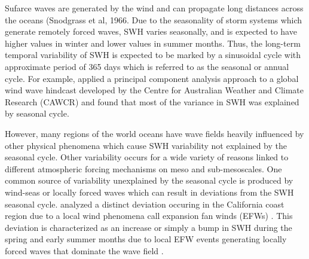 \documentclass[draft,linenumbers]{agujournal2018}
\begin{document}
Sufarce waves are generated by the wind and can propagate long distances across the oceans (Snodgrass et al, 1966. Due to the seasonality of storm systems which generate remotely forced waves, SWH varies seasonally, and is expected to have higher values in winter and lower values in summer months. Thus, the long-term temporal variability of SWH is expected to be marked by a sinusoidal cycle with approximate period of 365 days which is referred to as the seasonal or annual cycle. For example, \citet{echevarria2019seasonal} applied a principal component analysis approach to a global wind wave hindcast developed by the Centre for Australian Weather and Climate Research (CAWCR) and found that most of the variance in SWH was explained by seasonal cycle. 


However, many regions of the world oceans have wave fields heavily influenced by other physical phenomena which cause SWH variability not explained by the seasonal cycle. Other variability occurs for a wide variety of reasons linked to different atmospheric forcing mechanisms on meso and sub-mesoscales. One common source of variability unexplained by the seasonal cycle is produced by wind-seas or locally forced waves which can result in deviations from the SWH seasonal cycle. \citet{villas2017characterization} analyzed a distinct deviation occuring in the California coast region due to a local wind phenomena call expansion fan winds (EFWs) \cite{winant1988marine}. This deviation is characterized as an increase or simply a bump in SWH during the spring and early summer months due to local EFW events generating locally forced waves that dominate the wave field \cite{villas2017characterization}.   
\end{document}
